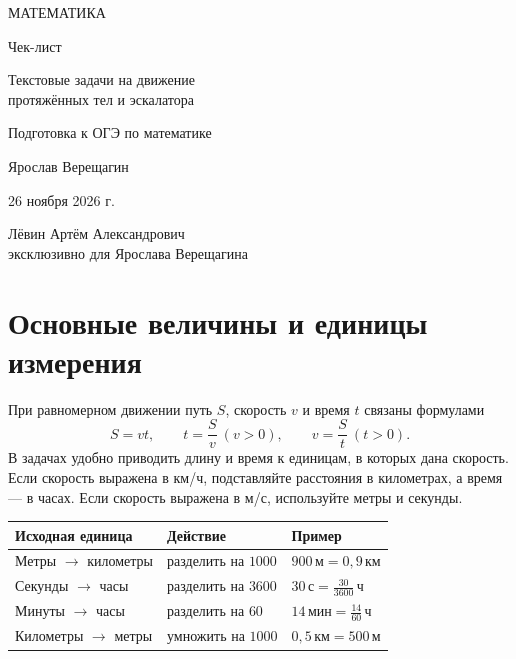 \documentclass[a4paper,12pt]{article}
\newcommand{\unit}[1]{\,\text{#1}}
\begin{document}
\begin{titlepage}
\thispagestyle{empty}
\centering
\vspace*{30mm}
{\Large\color{darkaccent} МАТЕМАТИКА\par}
\vspace{14mm}
{\Huge Чек-лист\par}
\vspace{11mm}
{\LARGE\color{accent} Текстовые задачи на движение\\[3pt] протяжённых тел и эскалатора\par}
\vspace{16mm}
{\large Подготовка к ОГЭ по математике\par}
\vfill
{\large Ярослав Верещагин\par}
\vspace{9mm}
{26 ноября 2026 г.\par}
\vspace{15mm}
{\small Лёвин Артём Александрович\\эксклюзивно для Ярослава Верещагина\par}
\vspace{17mm}
\vspace*{3mm}
\end{titlepage}
\setcounter{page}{1}

\section{Основные величины и единицы измерения}
При равномерном движении путь $S$, скорость $v$ и время $t$ связаны формулами
\[
 S=vt,\qquad t=\frac{S}{v}\ (v>0),\qquad v=\frac{S}{t}\ (t>0).
\]
В задачах удобно приводить длину и время к единицам, в которых дана скорость. Если скорость выражена в км/ч, подставляйте расстояния в километрах, а время --- в часах. Если скорость выражена в м/с, используйте метры и секунды.
\begin{center}
\begin{tabularx}{\linewidth}{@{}lXl@{}}
\toprule
Исходная единица & Действие & Пример \\
\midrule
Метры $\to$ километры & разделить на $1000$ & $900\unit{м}=0,9\unit{км}$\\
Секунды $\to$ часы & разделить на $3600$ & $30\unit{с}=\frac{30}{3600}\unit{ч}$\\
Минуты $\to$ часы & разделить на $60$ & $14\unit{мин}=\frac{14}{60}\unit{ч}$\\
Километры $\to$ метры & умножить на $1000$ & $0,5\unit{км}=500\unit{м}$\\
\bottomrule
\end{tabularx}
\end{center}
\end{document}

